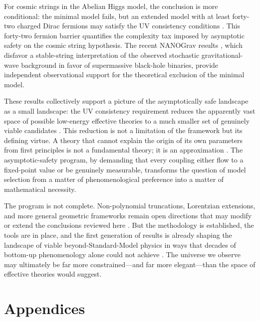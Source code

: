 \documentclass[12pt,a4paper]{article}
\begin{document}
For cosmic strings in the Abelian Higgs model, the conclusion is more
conditional: the minimal model fails, but an extended model with at least
forty-two charged Dirac fermions may satisfy the UV consistency conditions
\cite{EichhornLinoMiqueleto2023}. This forty-two fermion barrier quantifies
the complexity tax imposed by asymptotic safety on the cosmic string hypothesis.
The recent NANOGrav results \cite{NANOGrav2023}, which disfavor a stable-string
interpretation of the observed stochastic gravitational-wave background in
favor of supermassive black-hole binaries, provide independent observational
support for the theoretical exclusion of the minimal model.

These results collectively support a picture of the asymptotically safe
landscape as a small landscape: the UV consistency requirement reduces the
apparently vast space of possible low-energy effective theories to a much
smaller set of genuinely viable candidates \cite{Eichhorn2019,Percacci2017,
BuoninfanteEtal2025}. This reduction is not a limitation of the framework but
its defining virtue. A theory that cannot explain the origin of its own
parameters from first principles is not a fundamental theory; it is an
approximation \cite{WilsonKogut1974,Weinberg1979}. The asymptotic-safety
program, by demanding that every coupling either flow to a fixed-point value
or be genuinely measurable, transforms the question of model selection from a
matter of phenomenological preference into a matter of mathematical necessity.

The program is not complete. Non-polynomial truncations, Lorentzian extensions,
and more general geometric frameworks remain open directions that may modify
or extend the conclusions reviewed here \cite{BorissovaDittrichEichhornSchiffer2025,
EichhornGurauGyftopoulos2025}. But the methodology is established, the tools
are in place, and the first generation of results is already shaping the
landscape of viable beyond-Standard-Model physics in ways that decades of
bottom-up phenomenology alone could not achieve \cite{EichhornSchiffer2022handbook,
Eichhorn2022status}. The universe we observe may ultimately be far more
constrained---and far more elegant---than the space of effective theories would
suggest.


\newpage
\section*{Appendices}
\end{document}
